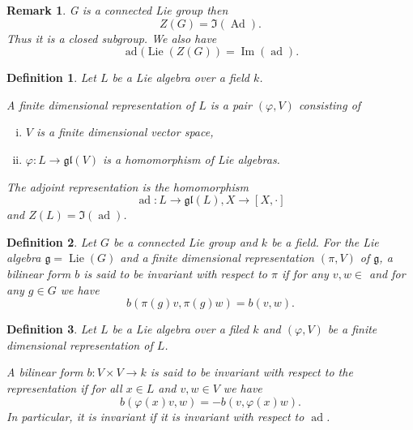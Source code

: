 \documentclass{article}
\newtheorem{definition}{Definition}[section]
\newtheorem{remark}{Remark}[section]
\numberwithin{equation}{section}
\DeclareMathOperator{\Image}{Im}
\DeclareMathOperator{\Ad}{Ad}
\DeclareMathOperator{\ad}{ad}
\DeclareMathOperator{\Lie}{Lie}
\begin{document}
\begin{remark}
G is a connected Lie group then
\begin{equation*}
Z(G)=\Im(\Ad).
\end{equation*}
Thus it is a closed subgroup. We also have
\begin{equation*}
\ad(\Lie(Z(G)) = \Image(\ad).
\end{equation*}
\end{remark}

\begin{definition}
Let $L$ be a Lie algebra over a field $k$.\\
\par A finite dimensional representation of $L$ is a pair $(\varphi, V)$ consisting of 
\begin{enumerate}[i).]
\item $V$ is a finite dimensional vector space,
\item $\varphi:L\to\mathfrak{gl}(V)$ is a homomorphism of Lie algebras.
\end{enumerate}
The adjoint representation is the homomorphism 
\begin{equation*}
\ad:L\to\mathfrak{gl}(L), X\to[X,\cdot]
\end{equation*}
and $Z(L)=\Im(\ad)$.%
\end{definition}

\begin{definition}
Let $G$ be a connected Lie group and $k$ be a field. For the Lie algebra $\mathfrak{g}=\Lie(G)$ and a finite dimensional representation $(\pi,V)$ of $\mathfrak{g}$, a bilinear form $b$%
is said to be invariant with respect to $\pi$ if for any $v,w\in $%
and for any $g\in G$ we have
\begin{equation*}
b(\pi(g)v,\pi(g)w) = b(v,w).
\end{equation*}
\end{definition}

\begin{definition}
Let $L$ be a Lie algebra over a filed $k$ and $(\varphi, V)$ be a finite dimensional representation of $L$.\\
\par A bilinear form $b:V\times V\to k$ is said to be invariant with respect to the representation if for all $x\in L$ and $v,w\in V$ we have
\begin{equation*}
b(\varphi(x)v,w)=-b(v,\varphi(x)w).
\end{equation*}
In particular, it is invariant if it is invariant with respect to $\ad$.
\end{definition}
\end{document}
